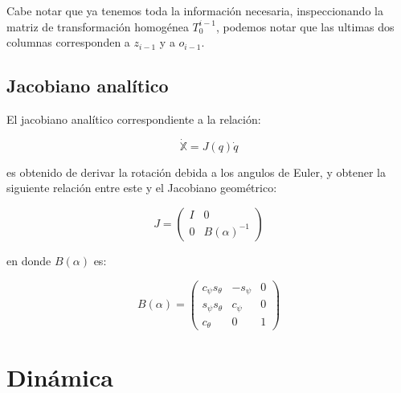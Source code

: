 \begin{multicols*}{3}
            Cabe notar que ya tenemos toda la información necesaria, inspeccionando la matriz de transformación homogénea $T_0^{i-1}$, podemos notar que las ultimas dos columnas corresponden a $z_{i-1}$ y a $o_{i-1}$.


        \subsection{Jacobiano analítico}

            El jacobiano analítico correspondiente a la relación:

            \begin{equation}
                \dot{\mathbb{X}} = J(q) \dot{q}
            \end{equation}

            es obtenido de derivar la rotación debida a los angulos de Euler, y obtener la siguiente relación entre este y el Jacobiano geométrico:

            \begin{equation}
                J =
                \begin{pmatrix}
                    I & 0 \\
                    0 & B(\alpha)^{-1}
                \end{pmatrix}
            \end{equation}

            en donde $B(\alpha)$ es:

            \begin{equation}
                B(\alpha) =
                \begin{pmatrix}
                    c_{\psi} s_{\theta} & -s_{\psi} & 0 \\
                    s_{\psi} s_{\theta} & c_{\psi} & 0 \\
                    c_{\theta} & 0 & 1
                \end{pmatrix}
            \end{equation}


    \section{Dinámica}


\end{multicols*}
